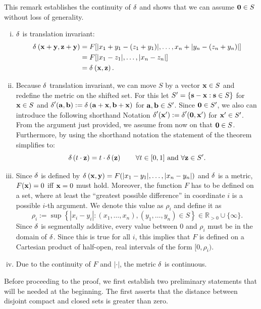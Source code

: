 \begin{rem} \label{lemma-rem}
	This remark establishes the continuity of $\operatorname{\delta}$ and shows that we can assume $\mathbf{0} \in S$ without loss of generality.
	\begin{enumerate}[(i)]
		\item $\operatorname{\delta}$ is translation invariant: \label{lemma-trans-invariance}
		      \begin{align*}
			      \operatorname{\delta}_{} \left( \mathbf{x}+\mathbf{y}, \mathbf{z}+\mathbf{y} \right) & = F[|x_1 + y_1 - (z_1 + y_1)|, \dots, x_n + |y_n - (z_n + y_n)|] \\
			                                          & = F[|x_1 - z_1|, \dots, |x_n - z_n|]                             \\
			                                          & = \operatorname{\delta}_{} \left( \mathbf{x}, \mathbf{z} \right).
		      \end{align*}
        \item Because $\operatorname{\delta}$ translation invariant, we can move $S$ by a vector $\mathbf{x} \in S$ and redefine the metric on the shifted set. For this let $S' = \{\mathbf{s} - \mathbf{x} : \mathbf{s} \in S\}$ for $\mathbf{x} \in S$ and $\operatorname{\delta}'(\mathbf{a},\mathbf{b}) := \operatorname{\delta}_{} \left( \mathbf{a}+\mathbf{x}, \mathbf{b}+\mathbf{x} \right)$ for $\mathbf{a}, \mathbf{b} \in S'$. Since $\mathbf{0} \in S'$, we also can introduce the following shorthand Notation $\operatorname{\delta}'(\mathbf{x}') := \operatorname{\delta}'(\mathbf{0}, \mathbf{x}')$ for $\mathbf{x}' \in S'$.
		      From the argument just provided, we assume from now on that $\mathbf{0} \in S$.
		      Furthermore, by using the shorthand notation the statement of the theorem simplifies to: \label{rem-lemma-translate-to-zero}
		      $$ \operatorname{\delta} \left( t \cdot  \mathbf{z} \right) = t \cdot \operatorname{\delta} \left( \mathbf{z} \right) \qquad \forall t \in [0, 1] \text{ and } \forall \mathbf{z} \in S' .$$
		\item Since $\operatorname{\delta}$ is defined by $\operatorname{\delta}_{} \left( \mathbf{x}, \mathbf{y} \right) = F(|x_1 - y_1|, \dots, |x_n - y_n|)$ and $\operatorname{\delta}$ is a metric, $F(\mathbf{x}) = 0$ iff $\mathbf{x}=0$ must hold. Moreover, the function $F$ has to be defined on a set, where at least the ``greatest possible difference'' in coordinate $i$ is a possible $i$-th argument. We denote this value as $\rho_i$ and define it as
		      $$\rho_i := \sup \left \{ |x_i - y_i| : (x_1, \dots, x_n), (y_1, \dots, y_n) \in S \right \} \in \mathbb{R}_{> 0} \cup \{\infty\}.$$
		      Since $\operatorname{\delta}$ is segmentally additive, every value between $0$ and $\rho_i$ must be in the domain of $\operatorname{\delta}$. Since this is true for all $i$, this implies that $F$ is defined on a Cartesian product of half-open, real intervals of the form $[0,\rho_i)$. \label{rem-lemma-domains}
		\item  Due to the continuity of $F$ and $| \cdot |$, the metric $\operatorname{\delta}$ is continuous. \label{rem-lemma-continuity}
	\end{enumerate}
\end{rem}
Before proceeding to the proof, we first establish two preliminary statements that will be needed at the beginning.
The first asserts that the distance between disjoint compact and closed sets is greater than zero.

